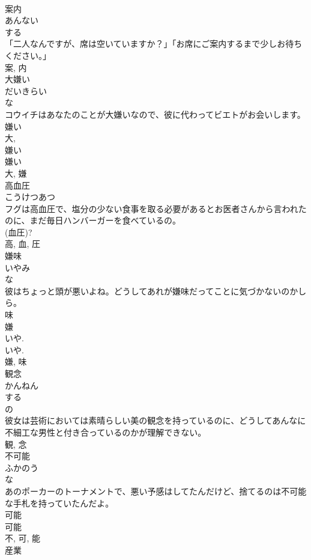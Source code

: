 \documentclass[8pt]{extreport}
\begin{document}
\begin{CJK}{UTF8}{min}
\\	案内	
\\	あんない	
\\	する 
\\	「二人なんですが、席は空いていますか？」「お席にご案内するまで少しお待ちください。」	
\\	案, 内	
\\	大嫌い	
\\	だいきらい	
\\	な 
\\	コウイチはあなたのことが大嫌いなので、彼に代わってビエトがお会いします。	
\\	嫌い 
\\	大, 
\\	嫌い 
\\	嫌い 
\\	大, 嫌	
\\	高血圧	
\\	こうけつあつ	
\\	フグは高血圧で、塩分の少ない食事を取る必要があるとお医者さんから言われたのに、まだ毎日ハンバーガーを食べているの。	
\\	(血圧)? 
\\	高, 血, 圧	
\\	嫌味	
\\	いやみ	
\\	な 
\\	彼はちょっと頭が悪いよね。どうしてあれが嫌味だってことに気づかないのかしら。	
\\	味 
\\	嫌 
\\	いや. 
\\	いや.
\\	嫌, 味	
\\	観念	
\\	かんねん	
\\	する 
\\	の 
\\	彼女は芸術においては素晴らしい美の観念を持っているのに、どうしてあんなに不細工な男性と付き合っているのかが理解できない。	
\\	観, 念	
\\	不可能	
\\	ふかのう	
\\	な 
\\	あのポーカーのトーナメントで、悪い予感はしてたんだけど、捨てるのは不可能な手札を持っていたんだよ。	
\\	可能 
\\	可能 
\\	不, 可, 能	
\\	産業	

\end{CJK}
\end{document}
